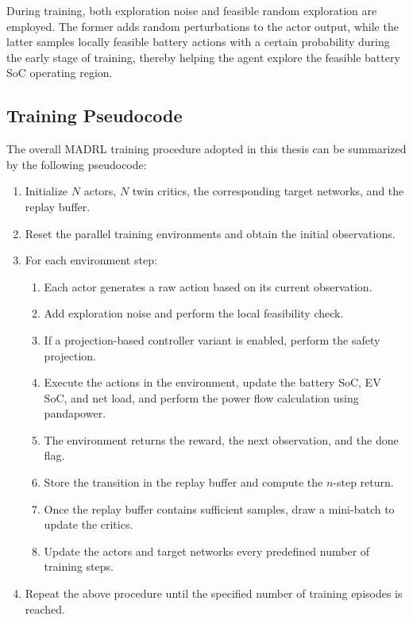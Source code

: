 During training, both exploration noise and feasible random exploration are employed. The former adds random perturbations to the actor output, while the latter samples locally feasible battery actions with a certain probability during the early stage of training, thereby helping the agent explore the feasible battery SoC operating region.

\subsection{Training Pseudocode}

The overall MADRL training procedure adopted in this thesis can be summarized by the following pseudocode:

\begin{enumerate}
  \item Initialize \(N\) actors, \(N\) twin critics, the corresponding target networks, and the replay buffer.
  \item Reset the parallel training environments and obtain the initial observations.
  \item For each environment step:
  \begin{enumerate}
    \item Each actor generates a raw action based on its current observation.
    \item Add exploration noise and perform the local feasibility check.
    \item If a projection-based controller variant is enabled, perform the safety projection.
    \item Execute the actions in the environment, update the battery SoC, EV SoC, and net load, and perform the power flow calculation using pandapower.
    \item The environment returns the reward, the next observation, and the done flag.
    \item Store the transition in the replay buffer and compute the \(n\)-step return.
    \item Once the replay buffer contains sufficient samples, draw a mini-batch to update the critics.
    \item Update the actors and target networks every predefined number of training steps.
  \end{enumerate}
  \item Repeat the above procedure until the specified number of training episodes is reached.
\end{enumerate}

